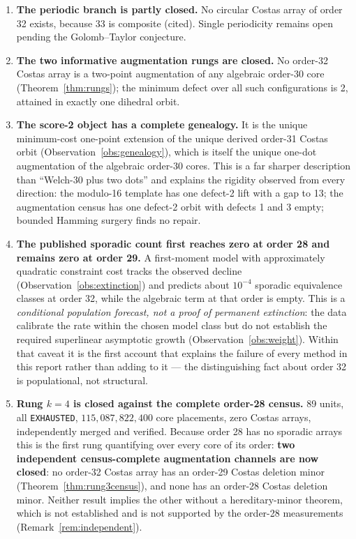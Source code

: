 \documentclass[11pt,a4paper]{article}
\theoremstyle{definition}
\begin{document}
\label{sec:synthesis}

\begin{enumerate}[label=\textbf{S\arabic*.},leftmargin=*]

\item \textbf{The periodic branch is partly closed.} No circular Costas array of
order 32 exists, because 33 is composite (cited). Single periodicity remains open
pending the Golomb--Taylor conjecture.

\item \textbf{The two informative augmentation rungs are closed.} No order-32
Costas array is a two-point augmentation of any algebraic order-30 core
(Theorem~\ref{thm:rungs}); the minimum defect over all such
configurations is 2, attained in exactly one dihedral orbit.

\item \textbf{The score-2 object has a complete genealogy.} It is the unique
minimum-cost one-point extension of the unique derived order-31 Costas orbit
(Observation~\ref{obs:genealogy}), which is itself the unique one-dot
augmentation of the algebraic order-30 cores. This is a far sharper description
than ``Welch-30 plus two dots'' and explains the rigidity observed from every
direction: the modulo-16 template has one defect-2 lift with a gap to 13; the
augmentation census has one defect-2 orbit with defects 1 and 3 empty; bounded
Hamming surgery finds no repair.

\item \textbf{The published sporadic count first reaches zero at order 28 and
remains zero at order 29.} A first-moment model with approximately quadratic
constraint cost tracks the observed decline
(Observation~\ref{obs:extinction}) and predicts about $10^{-4}$ sporadic
equivalence classes at order 32, while the algebraic term at that order is empty.
This is a \emph{conditional population forecast, not a proof of permanent
extinction}: the data calibrate the rate within the chosen model class but do not
establish the required superlinear asymptotic growth
(Observation~\ref{obs:weight}). Within that caveat it is the first account that
explains the failure of every method in this report rather than adding to it ---
the distinguishing fact about order 32 is populational, not structural.

\item \textbf{Rung $k=4$ is closed against the complete order-28 census.}
89 units, all \texttt{EXHAUSTED}, $115{,}087{,}822{,}400$ core placements, zero
Costas arrays, independently merged and verified. Because order 28 has no
sporadic arrays this is the first rung quantifying over every core of its order:
\textbf{two independent census-complete augmentation channels are now closed}:
no order-32 Costas array has an order-29 Costas deletion minor
(Theorem~\ref{thm:rung3census}), and none has an order-28 Costas deletion minor.
Neither result implies the other without a hereditary-minor theorem, which
is not established and is not supported by the order-28 measurements
(Remark~\ref{rem:independent}).


\end{enumerate}
\end{document}
